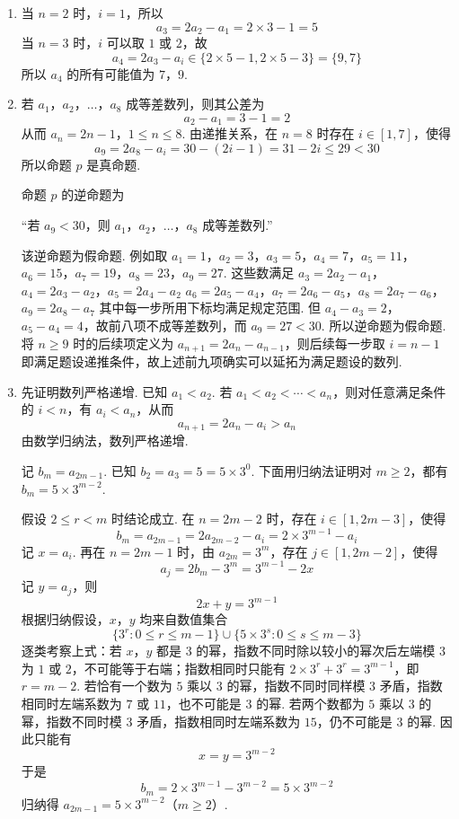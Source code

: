 \begin{solution}
\begin{enumerate}
\item 当 \(n=2\) 时，\(i=1\)，所以
\[
a_3=2a_2-a_1=2\times3-1=5
\]
当 \(n=3\) 时，\(i\) 可以取 \(1\) 或 \(2\)，故
\[
a_4=2a_3-a_i\in\{2\times5-1,2\times5-3\}=\{9,7\}
\]
所以 \(a_4\) 的所有可能值为 \(7\)，\(9\).

\item 若 \(a_1\)，\(a_2\)，\(\ldots\)，\(a_8\) 成等差数列，则其公差为
\[
a_2-a_1=3-1=2
\]
从而 \(a_n=2n-1\)，\(1\le n\le8\). 由递推关系，在 \(n=8\) 时存在 \(i\in[1,7]\)，使得
\[
a_9=2a_8-a_i=30-(2i-1)=31-2i\le29<30
\]
所以命题 \(p\) 是真命题.

命题 \(p\) 的逆命题为

“若 \(a_9<30\)，则 \(a_1\)，\(a_2\)，\(\ldots\)，\(a_8\) 成等差数列.”

该逆命题为假命题. 例如取
\(a_1=1\)，\(a_2=3\)，\(a_3=5\)，\(a_4=7\)，\(a_5=11\)，\(a_6=15\)，\(a_7=19\)，\(a_8=23\)，\(a_9=27\).
这些数满足
\(a_3=2a_2-a_1\)，\(a_4=2a_3-a_2\)，\(a_5=2a_4-a_2\)
\(a_6=2a_5-a_4\)，\(a_7=2a_6-a_5\)，\(a_8=2a_7-a_6\)，\(a_9=2a_8-a_7\)
其中每一步所用下标均满足规定范围. 但 \(a_4-a_3=2\)，\(a_5-a_4=4\)，故前八项不成等差数列，而 \(a_9=27<30\). 所以逆命题为假命题.
将 \(n\ge9\) 时的后续项定义为 \(a_{n+1}=2a_n-a_{n-1}\)，则后续每一步取 \(i=n-1\) 即满足题设递推条件，故上述前九项确实可以延拓为满足题设的数列.

\item 先证明数列严格递增. 已知 \(a_1<a_2\). 若 \(a_1<a_2<\cdots<a_n\)，则对任意满足条件的 \(i<n\)，有 \(a_i<a_n\)，从而
\[
a_{n+1}=2a_n-a_i>a_n
\]
由数学归纳法，数列严格递增.

记 \(b_m=a_{2m-1}\). 已知 \(b_2=a_3=5=5\times3^0\). 下面用归纳法证明对 \(m\ge2\)，都有 \(b_m=5\times3^{m-2}\).

假设 \(2\le r<m\) 时结论成立. 在 \(n=2m-2\) 时，存在 \(i\in[1,2m-3]\)，使得
\[
b_m=a_{2m-1}=2a_{2m-2}-a_i=2\times3^{m-1}-a_i
\]
记 \(x=a_i\). 再在 \(n=2m-1\) 时，由 \(a_{2m}=3^m\)，存在 \(j\in[1,2m-2]\)，使得
\[
a_j=2b_m-3^m=3^{m-1}-2x
\]
记 \(y=a_j\)，则
\[
2x+y=3^{m-1}
\]
根据归纳假设，\(x\)，\(y\) 均来自数值集合
\[
\{3^r:0\le r\le m-1\}\cup\{5\times3^s:0\le s\le m-3\}
\]
逐类考察上式：若 \(x\)，\(y\) 都是 \(3\) 的幂，指数不同时除以较小的幂次后左端模 \(3\) 为 \(1\) 或 \(2\)，不可能等于右端；指数相同时只能有 \(2\times3^r+3^r=3^{m-1}\)，即 \(r=m-2\). 若恰有一个数为 \(5\) 乘以 \(3\) 的幂，指数不同时同样模 \(3\) 矛盾，指数相同时左端系数为 \(7\) 或 \(11\)，也不可能是 \(3\) 的幂. 若两个数都为 \(5\) 乘以 \(3\) 的幂，指数不同时模 \(3\) 矛盾，指数相同时左端系数为 \(15\)，仍不可能是 \(3\) 的幂. 因此只能有
\[
x=y=3^{m-2}
\]
于是
\[
b_m=2\times3^{m-1}-3^{m-2}=5\times3^{m-2}
\]
归纳得 \(a_{2m-1}=5\times3^{m-2}\)（\(m\ge2\)）.


\end{enumerate}
\end{solution}
